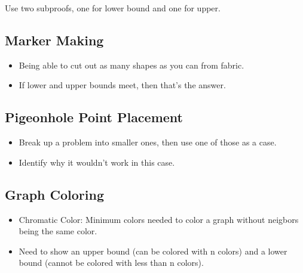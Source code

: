 Use two subproofs, one for lower bound and one for upper.

\subsection{Marker Making}
\begin{itemize}
    \item Being able to cut out as many shapes as you can from fabric.
    \item If lower and upper bounds meet, then that's the answer.
\end{itemize}

\subsection{Pigeonhole Point Placement}
\begin{itemize}
    \item Break up a problem into smaller ones, then use one of those as a case.
    \item Identify why it wouldn't work in this case.
\end{itemize}

\subsection{Graph Coloring}
\begin{itemize}
    \item Chromatic Color: Minimum colors needed to color a graph without neigbors being the same color.
    \item Need to show an upper bound (can be colored with n colors) and a lower bound (cannot be colored with less than n colors).
\end{itemize}